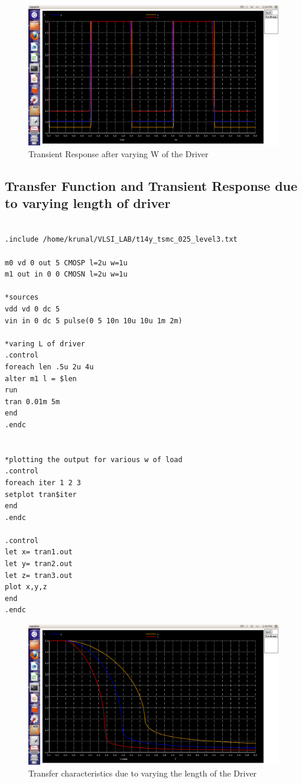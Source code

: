 \documentclass[12pt,a4paper]{article}
\begin{document}
\begin{center}
\begin{figure}[!ht]
\centering
\includegraphics[scale=0.37]{lab3_pic3_4_transient_dueto_varing_Wof_driver.png}
\caption[Short]{Transient Response after varying W of the Driver}
\end{figure}

\subsection{Transfer Function and Transient Response due to varying length of driver}
\begin{lstlisting}

.include /home/krunal/VLSI_LAB/t14y_tsmc_025_level3.txt

m0 vd 0 out 5 CMOSP l=2u w=1u 
m1 out in 0 0 CMOSN l=2u w=1u	

*sources
vdd vd 0 dc 5 
vin in 0 dc 5 pulse(0 5 10n 10u 10u 1m 2m)

*varing L of driver
.control
foreach len .5u 2u 4u
alter m1 l = $len
run
tran 0.01m 5m
end
.endc


*plotting the output for various w of load
.control
foreach iter 1 2 3
setplot tran$iter
end
.endc

.control
let x= tran1.out
let y= tran2.out
let z= tran3.out
plot x,y,z
end
.endc

\end{lstlisting}

\begin{figure}[!ht]
\centering
\includegraphics[scale=0.31]{lab_3pic3_5_transfer_fun_dueto_varing_Lof_driver.png}
\caption[Short]{Transfer characteristics due to varying the length of the Driver}
\end{figure}


\end{center}
\end{document}
